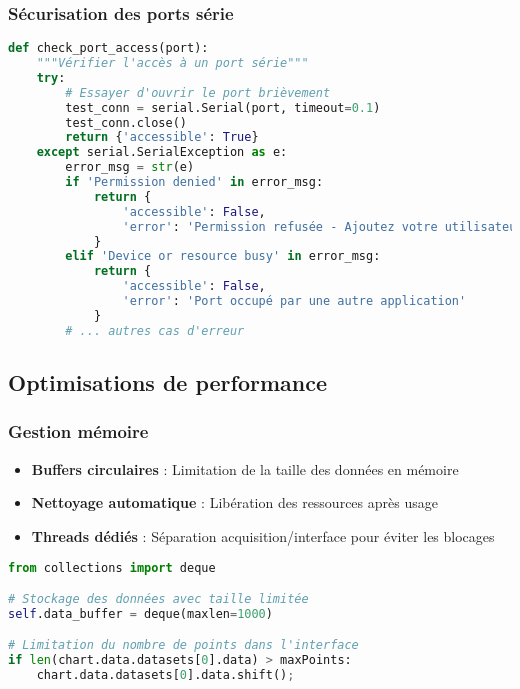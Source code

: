 \documentclass[12pt,a4paper]{article}
\begin{document}
\subsubsection{Sécurisation des ports série}

\begin{lstlisting}[language=python, caption=Vérification de l'accès aux ports]
def check_port_access(port):
    """Vérifier l'accès à un port série"""
    try:
        # Essayer d'ouvrir le port brièvement
        test_conn = serial.Serial(port, timeout=0.1)
        test_conn.close()
        return {'accessible': True}
    except serial.SerialException as e:
        error_msg = str(e)
        if 'Permission denied' in error_msg:
            return {
                'accessible': False,
                'error': 'Permission refusée - Ajoutez votre utilisateur au groupe dialout'
            }
        elif 'Device or resource busy' in error_msg:
            return {
                'accessible': False,
                'error': 'Port occupé par une autre application'
            }
        # ... autres cas d'erreur
\end{lstlisting}

\subsection{Optimisations de performance}

\subsubsection{Gestion mémoire}

\begin{itemize}
    \item \textbf{Buffers circulaires} : Limitation de la taille des données en mémoire
    \item \textbf{Nettoyage automatique} : Libération des ressources après usage
    \item \textbf{Threads dédiés} : Séparation acquisition/interface pour éviter les blocages
\end{itemize}

\begin{lstlisting}[language=python, caption=Gestion des buffers circulaires]
from collections import deque

# Stockage des données avec taille limitée
self.data_buffer = deque(maxlen=1000)

# Limitation du nombre de points dans l'interface
if len(chart.data.datasets[0].data) > maxPoints:
    chart.data.datasets[0].data.shift();
\end{lstlisting}
\end{document}
